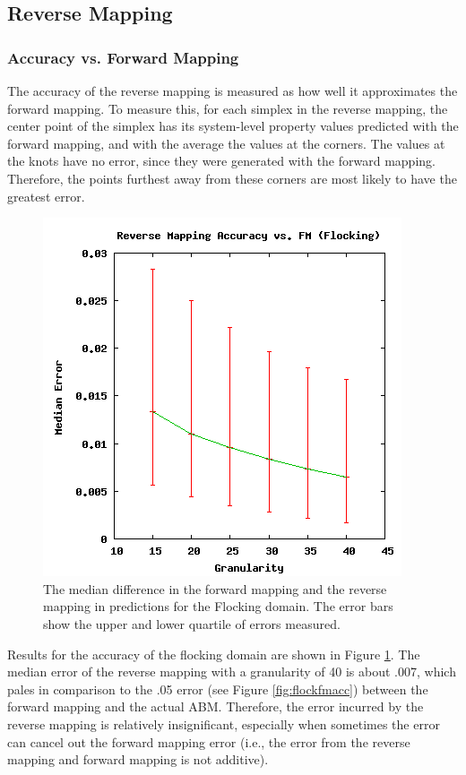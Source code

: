  \subsection{Reverse Mapping}

  \subsubsection{Accuracy vs. Forward Mapping}

The accuracy of the reverse mapping is measured as how well it approximates the forward mapping.
To measure this, for each simplex in the reverse mapping, the center point of the simplex has its system-level property values predicted with the forward mapping, and with the average the values at the corners.
The values at the knots have no error, since they were generated with the forward mapping.
Therefore, the points furthest away from these corners are most likely to have the greatest error.

\begin{figure}[ht]
\centering
\includegraphics[scale=.5]{images/results_flocking/rmacc.png}
\caption{The median difference in the forward mapping and the reverse mapping in predictions for the Flocking domain.
The error bars show the upper and lower quartile of errors measured.}
\label{fig:flockrmacc}
\end{figure}

Results for the accuracy of the flocking domain are shown in Figure \ref{fig:flockrmacc}.
The median error of the reverse mapping with a granularity of 40 is about .007, which pales in comparison to the .05 error (see Figure \ref{fig:flockfmacc}) between the forward mapping and the actual ABM.
Therefore, the error incurred by the reverse mapping is relatively insignificant, especially when sometimes the error can cancel out the forward mapping error (i.e., the error from the reverse mapping and forward mapping is not additive).


